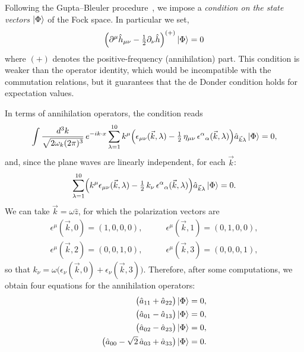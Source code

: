 \documentclass[12pt,a4paper,oneside]{article}
\numberwithin{equation}{section}   %
\begin{document}
Following the Gupta--Bleuler procedure~\cite{Gupta1952,GreinerFQ}, we impose a \textit{condition on the state
vectors} $\ket{\Phi}$ of the Fock space. In particular we set,
\begin{equation} \label{GPC1}
  \Bigl(\partial^\mu \hat{h}_{\mu\nu}
        - \tfrac{1}{2}\partial_\nu \hat{h}\Bigr)^{(+)} \ket{\Phi} = 0
\end{equation}
where $(+)$ denotes the positive-frequency (annihilation) part.
This condition is weaker than the operator identity, which would be incompatible
with the commutation relations, but it guarantees that the de Donder condition
holds for expectation values.

In terms of annihilation operators, the condition reads
\begin{equation}
    \int \frac{d^3k}{\sqrt{2\omega_k(2\pi)^3}}\,e^{-ik\cdot x}\sum_{\lambda=1}^{10} k^\mu \Bigl(
         \epsilon_{\mu\nu}(\vec k,\lambda) -\tfrac12\, \eta_{\mu\nu}\, \epsilon^\alpha{}_\alpha(\vec k,\lambda)\Bigr)
    \hat{a}_{\vec{k}\lambda}\ket{\Phi} = 0 ,
\end{equation}
and, since the plane waves are linearly independent, for each $\vec k$:
\begin{equation}
    \sum_{\lambda=1}^{10}\Bigl(k^\mu \epsilon_{\mu\nu}(\vec k,\lambda) -\tfrac12\, k_\nu\, \epsilon^\alpha{}_\alpha(\vec k,\lambda)\Bigr)\hat a_{\vec k\lambda}\ket{\Phi} = 0 .
\end{equation}
We can take $\vec k=\omega\hat z$, for which the polarization vectors are
\begin{align}
\epsilon^\mu(\vec k,0)=(1,0,0,0),&\qquad
\epsilon^\mu(\vec k,1)=(0,1,0,0),\\
\epsilon^\mu(\vec k,2)=(0,0,1,0),&\qquad
\epsilon^\mu(\vec k,3)=(0,0,0,1),
\end{align}
so that
$k_\nu=\omega\bigl(\epsilon_\nu(\vec k,0)+\epsilon_\nu(\vec k,3)\bigr)$.
Therefore, after some computations, we obtain four equations for the
annihilation operators:
\begin{subequations}\label{GBE}
\begin{align}
\bigl(\hat a_{11}+\hat a_{22}\bigr)\ket{\Phi}&=0,\\
\bigl(\hat{a}_{01}-\hat{a}_{13}\bigr)\ket{\Phi} &=0,\\
\bigl(\hat{a}_{02}-\hat{a}_{23}\bigr)\ket{\Phi}&=0, \\
\bigl(\hat a_{00}-\sqrt2\,\hat a_{03}+\hat a_{33}\bigr)\ket{\Phi}&=0 .
\end{align}
\end{subequations}
\end{document}
